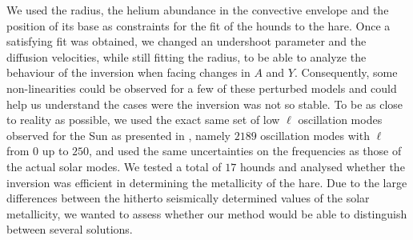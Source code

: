 \documentclass[a4paper,fleqn,usenatbib]{mnras}
\begin{document}
We used the radius, the helium abundance in the convective envelope and the position of its base as constraints for the fit of the hounds to the hare. Once a satisfying fit was obtained, we changed an undershoot parameter and the diffusion velocities, while still fitting the radius, to be able to analyze the behaviour of the inversion when facing changes in $A$ and $Y$. Consequently, some non-linearities could be observed for a few of these perturbed models and could help us understand the cases were the inversion was not so stable. To be as close to reality as possible, we used the exact same set of low $\ell$ oscillation modes observed for the Sun as presented in \citet{BasuFreq}, namely $2189$ oscillation modes with $\ell$ from $0$ up to $250$, and used the same uncertainties on the frequencies as those of the actual solar modes. We tested a total of $17$ hounds and analysed whether the inversion was efficient in determining the metallicity of the hare. Due to the large differences between the hitherto seismically determined values of the solar metallicity, we wanted to assess whether our method would be able to distinguish between several solutions. 
\end{document}
